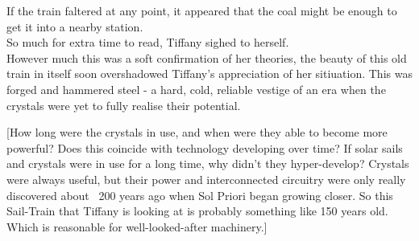 If the train faltered at any point, it appeared that the coal might be enough to get it into a nearby station.\\

So much for extra time to read, Tiffany sighed to herself.\\

However much this was a soft confirmation of her theories, the beauty of this old train in itself soon overshadowed Tiffany's appreciation of her sitiuation.
This was forged and hammered steel - a hard, cold, reliable vestige of an era when the crystals were yet to fully realise their potential. 

[How long were the crystals in use, and when were they able to become more powerful? 
Does this coincide with technology developing over time?
If solar sails and crystals were in use for a long time, why didn't they hyper-develop?
Crystals were always useful, but their power and interconnected circuitry were only really discovered about ~200 years ago when Sol Priori began growing closer.
So this Sail-Train that Tiffany is looking at is probably something like 150 years old.
Which is reasonable for well-looked-after machinery.]